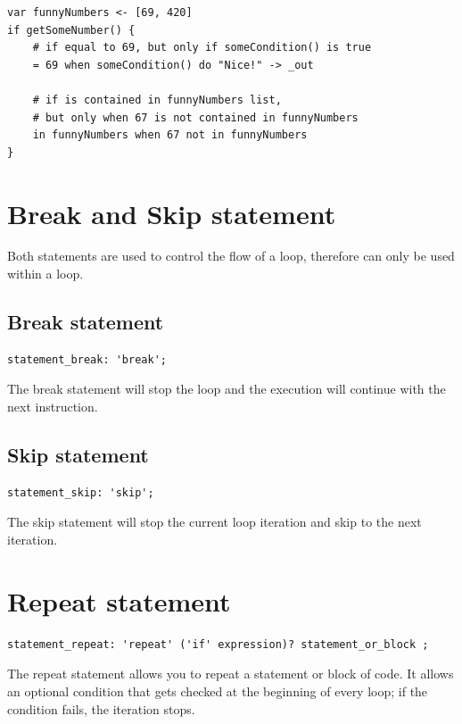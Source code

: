 \begin{verbatim}
var funnyNumbers <- [69, 420] 
if getSomeNumber() {
	# if equal to 69, but only if someCondition() is true
	= 69 when someCondition() do "Nice!" -> _out

	# if is contained in funnyNumbers list,
	# but only when 67 is not contained in funnyNumbers
	in funnyNumbers when 67 not in funnyNumbers
}
\end{verbatim}

\clearpage

\section{Break and Skip statement}

Both statements are used to control the flow of a loop, therefore can only be
used within a loop.

\subsection{Break statement}

\begin{verbatim}
statement_break: 'break';
\end{verbatim}

The break statement will stop the loop and the execution will continue with the
next instruction.

\subsection{Skip statement}

\begin{verbatim}
statement_skip: 'skip';
\end{verbatim}

The skip statement will stop the current loop iteration and skip to the next
iteration.

\section{Repeat statement}

\begin{verbatim}
statement_repeat: 'repeat' ('if' expression)? statement_or_block ;
\end{verbatim}

The repeat statement allows you to repeat a statement or block of code. It
allows an optional condition that gets checked at the beginning of every loop;
if the condition fails, the iteration stops.

